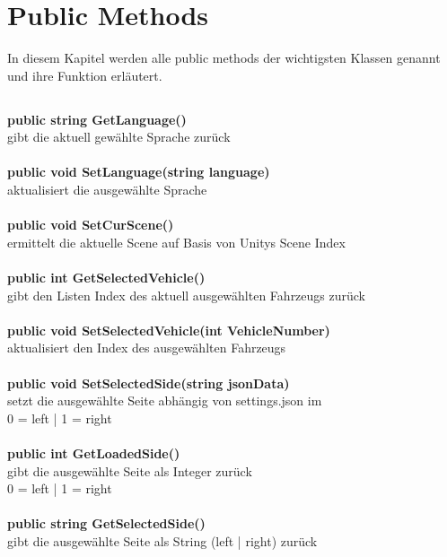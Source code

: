\chapter{Public Methods}
\label{cha:public_meth}
%
In diesem Kapitel werden alle public methods der wichtigsten Klassen genannt und ihre Funktion erläutert.
%
\section{\ssc}
\label{sec:statemeth}
%
\textbf{public string GetLanguage()}\\
gibt die aktuell gewählte Sprache zurück\\
\\
\textbf{public void SetLanguage(string language)}\\
aktualisiert die ausgewählte Sprache\\
\\
\textbf{public void SetCurScene()}\\
ermittelt die aktuelle Scene auf Basis von Unitys Scene Index\\
\\
\textbf{public int GetSelectedVehicle()}\\
gibt den Listen Index des aktuell ausgewählten Fahrzeugs zurück\\
\\
\textbf{public void SetSelectedVehicle(int VehicleNumber)}\\
aktualisiert den Index des ausgewählten Fahrzeugs\\
\\
\textbf{public void SetSelectedSide(string jsonData)}\\
setzt die ausgewählte Seite abhängig von settings.json im \sad \\
0 = left | 1 = right\\
\\
\textbf{public int GetLoadedSide()}\\
gibt die ausgewählte Seite als Integer zurück\\
0 = left | 1 = right\\
\\
\textbf{public string GetSelectedSide()}\\
gibt die ausgewählte Seite als String (left | right) zurück\\
%
